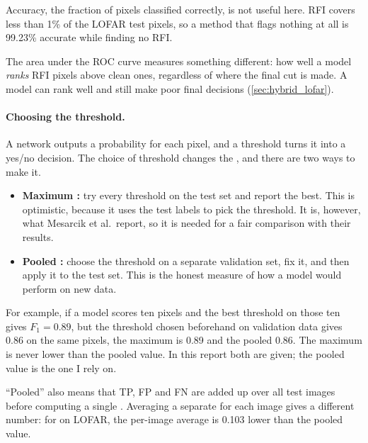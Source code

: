 Accuracy, the fraction of pixels classified correctly, is not useful here.
RFI covers less than 1\% of the LOFAR test pixels, so a method that flags
nothing at all is 99.23\% accurate while finding no RFI.

The area under the ROC curve measures something different: how well a model
\emph{ranks} RFI pixels above clean ones, regardless of where the final cut is
made. A model can rank well and still make poor final decisions
(\cref{sec:hybrid_lofar}).

\paragraph{Choosing the threshold.} A network outputs a probability for each
pixel, and a threshold turns it into a yes/no decision. The choice of threshold
changes the \Fone{}, and there are two ways to make it.
\begin{itemize}
  \item \textbf{Maximum \Fone{}:} try every threshold on the test set and report
    the best. This is optimistic, because it uses the test labels to pick the
    threshold. It is, however, what Mesarcik et al.\ report, so it is needed
    for a fair comparison with their results.
  \item \textbf{Pooled \Fone{}:} choose the threshold on a separate validation
    set, fix it, and then apply it to the test set. This is the honest
    measure of how a model would perform on new data.
\end{itemize}
For example, if a model scores ten pixels and the best threshold on those ten
gives $F_1 = 0.89$, but the threshold chosen beforehand on validation data
gives $0.86$ on the same pixels, the maximum \Fone{} is 0.89 and the pooled
\Fone{} 0.86. The maximum is never lower than the pooled value. In this report
both are given; the pooled value is the one I rely on.

``Pooled'' also means that TP, FP and FN are added up over all test images
before computing a single \Fone{}. Averaging a separate \Fone{} for each image
gives a different number: for \aoflagger{} on LOFAR, the per-image average is
0.103 lower than the pooled value.
